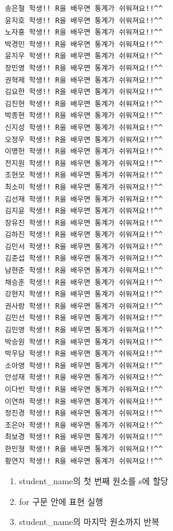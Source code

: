 \documentclass[
  11pt,
]{krantz}
\makeatletter
\providecommand{\tightlist}{%
  \setlength{\itemsep}{0pt}\setlength{\parskip}{0pt}}
\newenvironment{kframe}{%
\medskip{}
\setlength{\fboxsep}{.8em}
 \def\at@end@of@kframe{}%
 \ifinner\ifhmode%
  \def\at@end@of@kframe{\end{minipage}}%
  \begin{minipage}{\columnwidth}%
 \fi\fi%
 \def\FrameCommand##1{\hskip\@totalleftmargin \hskip-\fboxsep
 \colorbox{shadecolor}{##1}\hskip-\fboxsep
     \hskip-\linewidth \hskip-\@totalleftmargin \hskip\columnwidth}%
 \MakeFramed {\advance\hsize-\width
   \@totalleftmargin\z@ \linewidth\hsize
   \@setminipage}}%
 {\par\unskip\endMakeFramed%
 \at@end@of@kframe}
\renewenvironment{quote}{\begin{kframe}}{\end{kframe}}
\makeatother
\begin{document}
\begin{verbatim}
송은철 학생!! R을 배우면 통계가 쉬워져요!!^^
윤지호 학생!! R을 배우면 통계가 쉬워져요!!^^
노자홍 학생!! R을 배우면 통계가 쉬워져요!!^^
박경민 학생!! R을 배우면 통계가 쉬워져요!!^^
윤지우 학생!! R을 배우면 통계가 쉬워져요!!^^
장민영 학생!! R을 배우면 통계가 쉬워져요!!^^
권혁제 학생!! R을 배우면 통계가 쉬워져요!!^^
김요한 학생!! R을 배우면 통계가 쉬워져요!!^^
김진현 학생!! R을 배우면 통계가 쉬워져요!!^^
박종현 학생!! R을 배우면 통계가 쉬워져요!!^^
신지성 학생!! R을 배우면 통계가 쉬워져요!!^^
오정우 학생!! R을 배우면 통계가 쉬워져요!!^^
이명헌 학생!! R을 배우면 통계가 쉬워져요!!^^
전지원 학생!! R을 배우면 통계가 쉬워져요!!^^
조현모 학생!! R을 배우면 통계가 쉬워져요!!^^
최소미 학생!! R을 배우면 통계가 쉬워져요!!^^
김선재 학생!! R을 배우면 통계가 쉬워져요!!^^
김지윤 학생!! R을 배우면 통계가 쉬워져요!!^^
장유진 학생!! R을 배우면 통계가 쉬워져요!!^^
김하진 학생!! R을 배우면 통계가 쉬워져요!!^^
김민서 학생!! R을 배우면 통계가 쉬워져요!!^^
김준섭 학생!! R을 배우면 통계가 쉬워져요!!^^
남현준 학생!! R을 배우면 통계가 쉬워져요!!^^
채승훈 학생!! R을 배우면 통계가 쉬워져요!!^^
강현지 학생!! R을 배우면 통계가 쉬워져요!!^^
권사랑 학생!! R을 배우면 통계가 쉬워져요!!^^
김민선 학생!! R을 배우면 통계가 쉬워져요!!^^
김민영 학생!! R을 배우면 통계가 쉬워져요!!^^
박승원 학생!! R을 배우면 통계가 쉬워져요!!^^
박우담 학생!! R을 배우면 통계가 쉬워져요!!^^
소아영 학생!! R을 배우면 통계가 쉬워져요!!^^
안성재 학생!! R을 배우면 통계가 쉬워져요!!^^
이다빈 학생!! R을 배우면 통계가 쉬워져요!!^^
이연하 학생!! R을 배우면 통계가 쉬워져요!!^^
정진경 학생!! R을 배우면 통계가 쉬워져요!!^^
조은아 학생!! R을 배우면 통계가 쉬워져요!!^^
최보경 학생!! R을 배우면 통계가 쉬워져요!!^^
한민형 학생!! R을 배우면 통계가 쉬워져요!!^^
황연지 학생!! R을 배우면 통계가 쉬워져요!!^^
\end{verbatim}

\normalsize

\begin{quote}
\begin{enumerate}
\def\labelenumi{\arabic{enumi}.}
\tightlist
\item
  student\_name의 첫 번째 원소를 s에 할당
\item
  for 구문 안에 표현 실행
\item
  student\_name의 마지막 원소까지 반복
\end{enumerate}
\end{quote}

\footnotesize
\end{document}
